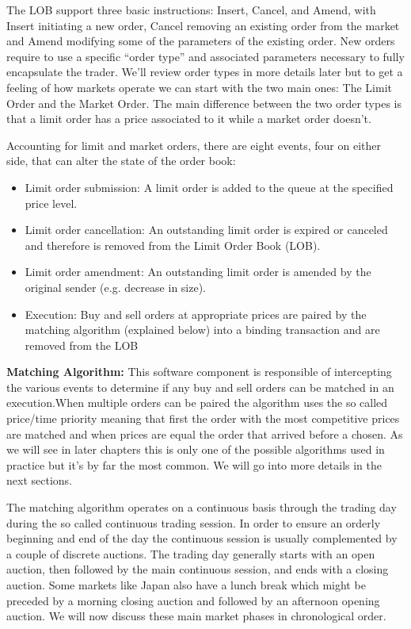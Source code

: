 The LOB support three basic instructions: Insert, Cancel, and Amend, with Insert initiating a new order, Cancel removing an existing order from the market and Amend modifying some of the parameters of the existing order. New orders require to use a specific ``order type''  and associated parameters necessary to fully encapsulate the trader. We'll review order types in more details later but to get a feeling of how markets operate we can start with the two main ones: The Limit Order and the Market Order. The main difference between the two order types is that a limit order has a price associated to it while a market order doesn't. 

Accounting for limit and market orders, there are eight events, four on either side, that can alter the state of the order book:
	\begin{itemize}
	\item Limit order submission: A limit order is added to the queue at the specified price level.
	\item Limit order cancellation: An outstanding limit order is expired or canceled and therefore is removed from the Limit Order Book (LOB).
	\item Limit order amendment: An outstanding limit order is amended by the original sender (e.g. decrease in size).
	\item Execution: Buy and sell orders at appropriate prices are paired by the matching algorithm (explained below) into a binding transaction and are removed from the LOB
	\end{itemize}

\noindent\textbf{Matching Algorithm:}
This software component is responsible of intercepting the various events to determine if any buy and sell orders can be matched in an execution.When multiple orders can be paired the algorithm uses the so called price/time priority meaning that first the order with the most competitive prices are matched and when prices are equal the order that arrived before a chosen. As we will see in later chapters this is only one of the possible algorithms used in practice but it's by far the most common. We will go into more details in the next sections.\twomedskip

The matching algorithm operates on a continuous basis through the trading day during the so called continuous trading session. In order to ensure  an orderly beginning and end of the day the continuous session is usually complemented by a couple of discrete auctions. The trading day generally starts with an open auction, then followed by the main continuous session, and ends with a closing auction. Some markets like Japan also have a lunch break which might be preceded by a morning closing auction and followed by an afternoon opening auction. We will now discuss these main market phases in chronological order.\twomedskip
	
